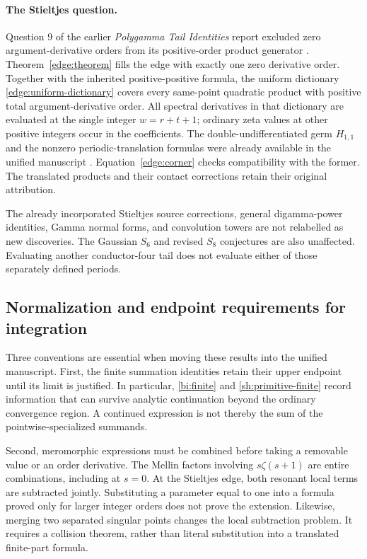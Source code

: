 \paragraph{The Stieltjes question.}
Question 9 of the earlier \emph{Polygamma Tail Identities} report
excluded zero argument-derivative orders from its positive-order
product generator \cite{tail-polygamma}. Theorem~\ref{edge:theorem}
fills the edge with exactly one zero derivative order. Together with
the inherited positive-positive formula, the uniform dictionary
\eqref{edge:uniform-dictionary} covers every same-point quadratic
product with positive total argument-derivative order. All spectral
derivatives in that dictionary are evaluated at the single integer
$w=r+t+1$; ordinary zeta values at other positive integers occur in
the coefficients. The double-undifferentiated germ $H_{1,1}$ and the
nonzero periodic-translation formulas were already available in the
unified manuscript \cite{manuscript}. Equation~\eqref{edge:corner}
checks compatibility with the former. The translated products and
their contact corrections retain their original attribution.

The already incorporated Stieltjes source corrections, general
digamma-power identities, Gamma normal forms, and convolution towers
are not relabelled as new discoveries. The Gaussian $S_6$ and revised
$S_8$ conjectures are also unaffected. Evaluating another conductor-four
tail does not evaluate either of those separately defined periods.

\subsection{Normalization and endpoint requirements for integration}

Three conventions are essential when moving these results into the
unified manuscript. First, the finite summation identities retain their
upper endpoint until its limit is justified. In particular,
\eqref{bi:finite} and \eqref{sh:primitive-finite} record information
that can survive analytic continuation beyond the ordinary convergence
region. A continued expression is not thereby the sum of the
pointwise-specialized summands.

Second, meromorphic expressions must be combined before taking a
removable value or an order derivative. The Mellin factors involving
$s\zeta(s+1)$ are entire combinations, including at $s=0$.
At the Stieltjes edge, both resonant local terms are subtracted
jointly. Substituting a parameter equal to one into a formula proved
only for larger integer orders does not prove the extension.
Likewise, merging two separated singular points changes the local
subtraction problem. It requires a collision theorem, rather than
literal substitution into a translated finite-part formula.

